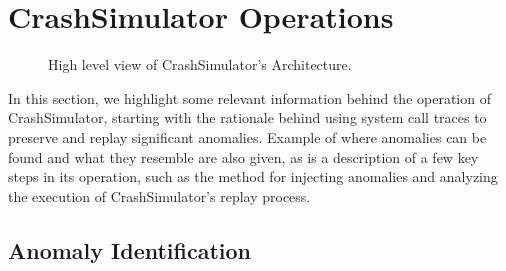 \section{CrashSimulator Operations}
\label{sec:approach}
    \begin{figure}[t]
        \center{}
        \caption{High level view of CrashSimulator's Architecture.}
        \label{figure:architecture}
    \end{figure}

      In this section, we highlight some relevant
    information behind the operation of CrashSimulator, starting with the
    rationale behind using system call traces to preserve and replay significant
    anomalies. Example of where anomalies can be found and what they resemble
    are also given, as is a description of a few key steps in its operation,
    such as the method for injecting anomalies and analyzing the execution of
    CrashSimulator’s replay process.
    

     

    \subsection{Anomaly Identification}
    
